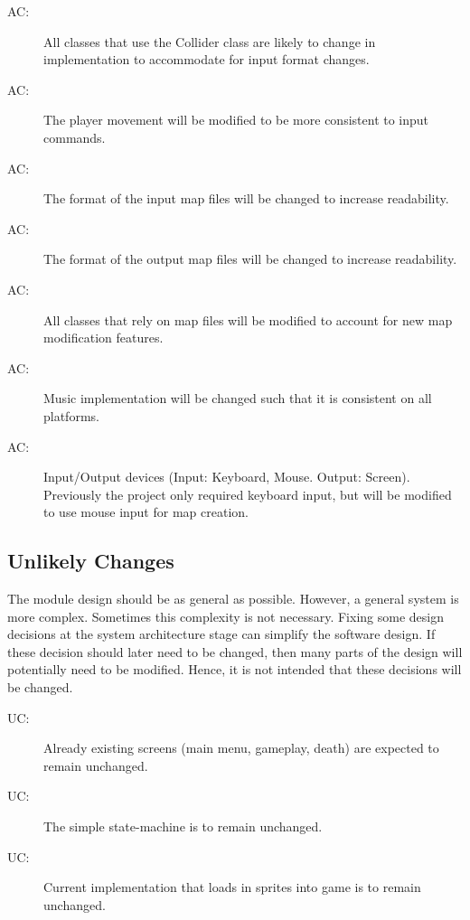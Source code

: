 \documentclass[12pt, titlepage]{article}
\newcounter{acnum}
\newcommand{\actheacnum}{AC\theacnum}
\newcounter{ucnum}
\newcommand{\uctheucnum}{UC\theucnum}
\begin{document}
\begin{description}
\item[ \actheacnum \label{acCollider}:] All classes that use the Collider class are likely to change in implementation to accommodate for input format changes.
\item[ \actheacnum \label{acMovement}:] The player movement will be modified to be more consistent to input commands.
\item[ \actheacnum \label{acInput}:] The format of the input map files will be changed to increase readability.
\item[ \actheacnum \label{acOutput}:] The format of the output map files will be changed to increase readability.
\item[ \actheacnum \label{acMap}:] All classes that rely on map files will be modified to account for new map modification features.
\item[ \actheacnum \label{acMusic}:] Music implementation will be changed such that it is consistent on all platforms.
\item[ \actheacnum \label{acDevice}:] Input/Output devices (Input: Keyboard, Mouse. Output: Screen). Previously the project only required keyboard input, but will be modified to use mouse input for map creation.
\end{description}

\subsection{Unlikely Changes} \label{SecUchange}

The module design should be as general as possible. However, a general system is
more complex. Sometimes this complexity is not necessary. Fixing some design
decisions at the system architecture stage can simplify the software design. If
these decision should later need to be changed, then many parts of the design
will potentially need to be modified. Hence, it is not intended that these
decisions will be changed.

\begin{description}
\item[ \uctheucnum \label{ucScreen}:] Already existing screens (main menu, gameplay, death) are expected to remain unchanged.
\item[ \uctheucnum \label{ucState}:] The simple state-machine is to remain unchanged.
\item[ \uctheucnum \label{ucSprite}:] Current implementation that loads in sprites into game is to remain unchanged.
\end{description}
\end{document}
